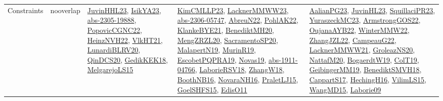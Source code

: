 {\begin{longtable}{llp{6cm}p{6cm}p{6cm}}
Constraints & nooverlap & \href{papers/JuvinHHL23.pdf}{JuvinHHL23}\cite{JuvinHHL23}, \href{articles/IsikYA23.pdf}{IsikYA23}\cite{IsikYA23}, \href{articles/abs-2305-19888.pdf}{abs-2305-19888}\cite{abs-2305-19888}, \href{papers/PopovicCGNC22.pdf}{PopovicCGNC22}\cite{PopovicCGNC22}, \href{articles/HeinzNVH22.pdf}{HeinzNVH22}\cite{HeinzNVH22}, \href{articles/VlkHT21.pdf}{VlkHT21}\cite{VlkHT21}, \href{articles/LunardiBLRV20.pdf}{LunardiBLRV20}\cite{LunardiBLRV20}, \href{articles/QinDCS20.pdf}{QinDCS20}\cite{QinDCS20}, \href{articles/GedikKEK18.pdf}{GedikKEK18}\cite{GedikKEK18}, \href{papers/MelgarejoLS15.pdf}{MelgarejoLS15}\cite{MelgarejoLS15} & \href{papers/KimCMLLP23.pdf}{KimCMLLP23}\cite{KimCMLLP23}, \href{articles/LacknerMMWW23.pdf}{LacknerMMWW23}\cite{LacknerMMWW23}, \href{articles/abs-2306-05747.pdf}{abs-2306-05747}\cite{abs-2306-05747}, \href{articles/AbreuN22.pdf}{AbreuN22}\cite{AbreuN22}, \href{articles/PohlAK22.pdf}{PohlAK22}\cite{PohlAK22}, \href{papers/KlankeBYE21.pdf}{KlankeBYE21}\cite{KlankeBYE21}, \href{articles/BenediktMH20.pdf}{BenediktMH20}\cite{BenediktMH20}, \href{articles/MengZRZL20.pdf}{MengZRZL20}\cite{MengZRZL20}, \href{articles/SacramentoSP20.pdf}{SacramentoSP20}\cite{SacramentoSP20}, \href{papers/MalapertN19.pdf}{MalapertN19}\cite{MalapertN19}, \href{papers/MurinR19.pdf}{MurinR19}\cite{MurinR19}, \href{articles/EscobetPQPRA19.pdf}{EscobetPQPRA19}\cite{EscobetPQPRA19}, \href{articles/Novas19.pdf}{Novas19}\cite{Novas19}, \href{articles/abs-1911-04766.pdf}{abs-1911-04766}\cite{abs-1911-04766}, \href{articles/LaborieRSV18.pdf}{LaborieRSV18}\cite{LaborieRSV18}, \href{articles/ZhangW18.pdf}{ZhangW18}\cite{ZhangW18}, \href{papers/BoothNB16.pdf}{BoothNB16}\cite{BoothNB16}, \href{articles/NovaraNH16.pdf}{NovaraNH16}\cite{NovaraNH16}, \href{papers/PraletLJ15.pdf}{PraletLJ15}\cite{PraletLJ15}, \href{articles/GoelSHFS15.pdf}{GoelSHFS15}\cite{GoelSHFS15}, \href{papers/EdisO11.pdf}{EdisO11}\cite{EdisO11} & \href{papers/AalianPG23.pdf}{AalianPG23}\cite{AalianPG23}, \href{papers/JuvinHL23.pdf}{JuvinHL23}\cite{JuvinHL23}, \href{papers/SquillaciPR23.pdf}{SquillaciPR23}\cite{SquillaciPR23}, \href{papers/YuraszeckMC23.pdf}{YuraszeckMC23}\cite{YuraszeckMC23}, \href{papers/ArmstrongGOS22.pdf}{ArmstrongGOS22}\cite{ArmstrongGOS22}, \href{papers/OujanaAYB22.pdf}{OujanaAYB22}\cite{OujanaAYB22}, \href{papers/WinterMMW22.pdf}{WinterMMW22}\cite{WinterMMW22}, \href{papers/ZhangJZL22.pdf}{ZhangJZL22}\cite{ZhangJZL22}, \href{articles/CampeauG22.pdf}{CampeauG22}\cite{CampeauG22}, \href{papers/LacknerMMWW21.pdf}{LacknerMMWW21}\cite{LacknerMMWW21}, \href{papers/GroleazNS20.pdf}{GroleazNS20}\cite{GroleazNS20}, \href{papers/NattafM20.pdf}{NattafM20}\cite{NattafM20}, \href{papers/BogaerdtW19.pdf}{BogaerdtW19}\cite{BogaerdtW19}, \href{papers/ColT19.pdf}{ColT19}\cite{ColT19}, \href{papers/GeibingerMM19.pdf}{GeibingerMM19}\cite{GeibingerMM19}, \href{papers/BenediktSMVH18.pdf}{BenediktSMVH18}\cite{BenediktSMVH18}, \href{papers/CappartS17.pdf}{CappartS17}\cite{CappartS17}, \href{papers/HechingH16.pdf}{HechingH16}\cite{HechingH16}, \href{papers/VilimLS15.pdf}{VilimLS15}\cite{VilimLS15}, \href{articles/WangMD15.pdf}{WangMD15}\cite{WangMD15}, \href{papers/Laborie09.pdf}{Laborie09}\cite{Laborie09}\\

\end{longtable}}
